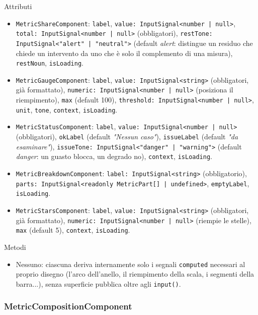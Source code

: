 \documentclass[a4paper,12pt]{article}
\begin{document}
\begin{sloppypar}
Attributi
\begin{itemize}\raggedright
    \item \texttt{MetricShareComponent}: \texttt{label}, \texttt{value: InputSignal<number | null>}, \texttt{total: InputSignal<number | null>} (obbligatori), \texttt{restTone: InputSignal<"alert" | "neutral">} (default \textit{alert}: distingue un residuo che chiede un intervento da uno che è solo il complemento di una misura), \texttt{restNoun}, \texttt{isLoading}.
    \item \texttt{MetricGaugeComponent}: \texttt{label}, \texttt{value: InputSignal<string>} (obbligatori, già formattato), \texttt{numeric: InputSignal<number | null>} (posiziona il riempimento), \texttt{max} (default 100), \texttt{threshold: InputSignal<number | null>}, \texttt{unit}, \texttt{tone}, \texttt{context}, \texttt{isLoading}.
    \item \texttt{MetricStatusComponent}: \texttt{label}, \texttt{value: InputSignal<number | null>} (obbligatori), \texttt{okLabel} (default \textit{"Nessun caso"}), \texttt{issueLabel} (default \textit{"da esaminare"}), \texttt{issueTone: InputSignal<"danger" | "warning">} (default \textit{danger}: un guasto blocca, un degrado no), \texttt{context}, \texttt{isLoading}.
    \item \texttt{MetricBreakdownComponent}: \texttt{label: InputSignal<string>} (obbligatorio), \texttt{parts: InputSignal<readonly MetricPart[] | undefined>}, \texttt{emptyLabel}, \texttt{isLoading}.
    \item \texttt{MetricStarsComponent}: \texttt{label}, \texttt{value: InputSignal<string>} (obbligatori, già formattato), \texttt{numeric: InputSignal<number | null>} (riempie le stelle), \texttt{max} (default 5), \texttt{context}, \texttt{isLoading}.
\end{itemize}

Metodi
\begin{itemize}\raggedright
    \item Nessuno: ciascuna deriva internamente solo i segnali \texttt{computed} necessari al proprio disegno (l'arco dell'anello, il riempimento della scala, i segmenti della barra...), senza superficie pubblica oltre agli \texttt{input()}.
\end{itemize}

\subsubsection{MetricCompositionComponent}


\end{sloppypar}
\end{document}
